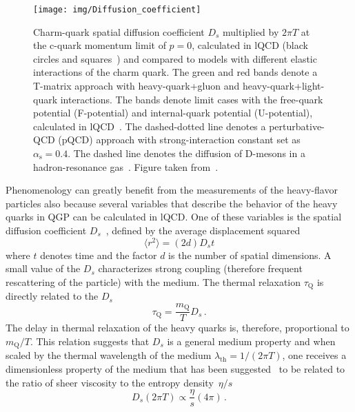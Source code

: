 \begin{figure}[!htb]
\begin{center}
 \texttt{[image: img/Diffusion\_coefficient]}
\caption[Charm-quark spatial diffusion coefficient $D_s$.]{\label{diffusion}Charm-quark spatial diffusion coefficient $D_s$ multiplied by $2\pi T$ at the c-quark momentum limit of $p = 0$, calculated in lQCD (black circles and squares~\cite{BanerjeeLattice,DingLattice}) and compared to models with different elastic interactions of the charm quark. The green and red bands denote a T-matrix approach with heavy-quark+gluon and heavy-quark+light-quark interactions. The bands denote limit cases with the free-quark potential (F-potential) and internal-quark potential (U-potential), calculated in lQCD~\cite{Tmatrix}\@. The dashed-dotted line denotes a perturbative-QCD (pQCD) approach with strong-interaction constant set as $\alpha_\mathrm{s} = 0.4$\@. The dashed line denotes the diffusion of D-mesons in a hadron-resonance gas~\cite{DmesonHRG}\@. Figure taken from~\cite{summaryHF}.}
\end{center}
\end{figure}


Phenomenology can greatly benefit from the measurements of the heavy-flavor particles also because several variables that describe the behavior of the heavy quarks in QGP can be calculated in lQCD\@.  One of these variables is the spatial diffusion coefficient $D_s$~\cite{BanerjeeLattice,DingLattice}, defined by the average displacement squared
\begin{equation}
 \langle r^2 \rangle = (2d) D_s t
\end{equation}
where $t$ denotes time and the factor $d$ is the number of spatial dimensions. A small value of the $D_s$ characterizes strong coupling (therefore frequent rescattering of the particle) with the medium. The thermal relaxation $\tau_\mathrm{Q}$ is directly related to the $D_s$~\cite{Prino_Rapp_HF}
\begin{equation}
 \tau_\mathrm{Q} = \frac{m_\mathrm{Q}}{T} D_s\,.
\end{equation}
The delay in thermal relaxation of the heavy quarks is, therefore, proportional to $m_\mathrm{Q}/T$\@. This relation suggests that $D_s$ is a general medium property and when scaled by the thermal wavelength of the medium $\lambda_\mathrm{th} = 1/(2 \pi T)$, one receives a dimensionless property of the medium that has been suggested~\cite{heavyThermalizationAndEtaOverS,QGP4} to be related to the ratio of sheer viscosity to the entropy density~$\eta/s$
\begin{equation}
D_s(2\pi T) \propto \frac{\eta}{s} (4\pi)\,.
\end{equation}

